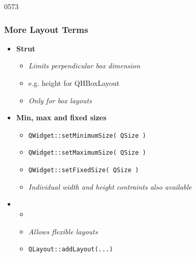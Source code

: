 \begin{slide}{0573}\frametitle{More Layout Terms}
\begin{itemize}
  \item \textbf{Strut}
    \begin{itemize}           
      \item \emph{Limits perpendicular box dimension }
      \item e.g. height for QHBoxLayout
      \item \emph{Only for box layouts}
    \end{itemize}
  \item \textbf{Min, max and fixed sizes}
    \begin{itemize}
    \item \texttt{QWidget::setMinimumSize( QSize )}
    \item \texttt{QWidget::setMaximumSize( QSize )}
    \item \texttt{QWidget::setFixedSize( QSize )}
    \item \emph{Individual width and height contraints also available}
    \end{itemize}   
  \item {} 
    \begin{itemize}
    \item[] 
    \item \emph{Allows flexible layouts}
    \item \texttt{QLayout::addLayout(...)}
    \end{itemize}
  \end{itemize}
\end{slide}


